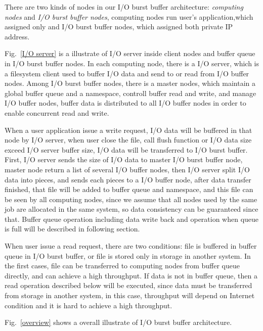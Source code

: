 \documentclass[JIP,draft]{ipsj}
\begin{document}
There are two kinds of nodes in our I/O burst buffer architecture: \emph{computing nodes} and \emph{I/O burst buffer nodes}, computing nodes run user's application,which assigned only  and I/O burst buffer nodes, which assigned both private IP address.

Fig.~\ref{I/O server} is a illustrate of I/O server inside client nodes and buffer queue in I/O burst buffer nodes.
In each computing node, there is a I/O server, which is a filesystem client used to buffer I/O data and send to or read from I/O buffer nodes.
Among I/O burst buffer nodes, there is a master nodes, which maintain a global buffer queue and a namespace, controll buffer read and write, and manage I/O buffer nodes, buffer data is distributed to all I/O buffer nodes in order to enable concurrent read and write.

When a user application issue a write request, I/O data will be buffered in that node by I/O server, when user close the file, call flush function or I/O data size exceed I/O server buffer size, I/O data will be transferred to I/O burst buffer.
First, I/O server sends the size of I/O data to master I/O burst buffer node, master node return a list of several I/O buffer nodes, then I/O server split I/O data into pieces, and sends each pieces to a I/O buffer node, after data transfer finished, that file will be added to buffer queue and namespace, and this file can be seen by all computing nodes, since we assume that all nodes used by the same job are allocated in the same system, so data consistency can be guaranteed since that.
Buffer queue operation including data write back and operation when queue is full will be described in following section.

When user issue a read request, there are two conditions: file is buffered in buffer queue in I/O burst buffer, or file is stored only in storage in another system.
In the first cases, file can be transferred to computing nodes from buffer queue directly, and can achieve a high throughput.
If data is not in buffer queue, then a read operation described below will be executed, since data must be transferred from storage in another system, in this case, throughput will depend on Internet condition and it is hard to achieve a high throughput.

Fig.~\ref{overview} shows a overall illustrate of I/O burst buffer architecture.

\end{document}
